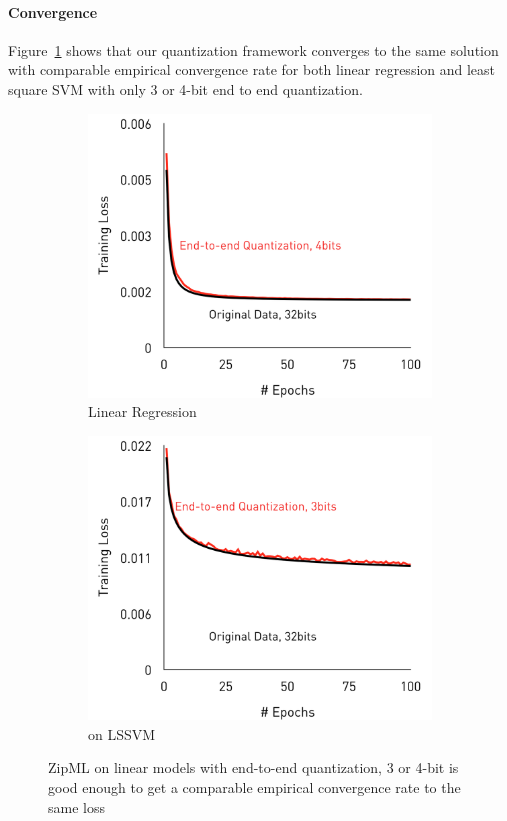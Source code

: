\documentclass{article}
\begin{document}
\paragraph{Convergence}
Figure~\ref{fig:convergence} shows that our quantization framework
converges to the same solution with comparable
empirical convergence rate for both linear regression and least square SVM
with only 3 or 4-bit end to end quantization. 

\begin{figure}[h]
\centering
    \begin{subfigure}[h]{.4\columnwidth}
    \includegraphics[width=\columnwidth]{final-experiments/LinearRegression} 
    \caption{Linear Regression}
    \end{subfigure}
    \begin{subfigure}[h]{.4\columnwidth}
    \includegraphics[width=\columnwidth]{final-experiments/LSSVM} 
    \caption{on LSSVM}
    \end{subfigure}
\caption{ZipML on linear models with end-to-end quantization, 3 or 4-bit is good enough to get a comparable empirical convergence rate to the same loss}
\label{fig:convergence}
\end{figure}
\end{document}
